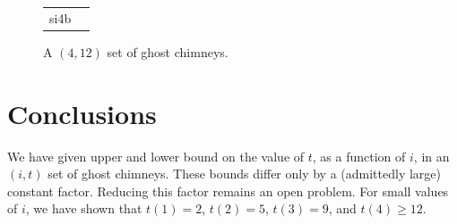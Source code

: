 \documentclass{cccg10}
\begin{document}
\begin{figure}
\begin{center}
\begin{tabular}{cc}
s{i4b}
    \end{tabular}
  \end{center}
  \caption{A $(4,12)$ set of ghost chimneys.}
\end{figure}


\section{Conclusions}

We have given upper and lower bound on the value of $t$, as a function of
$i$, in an $(i,t)$ set of ghost chimneys.  These bounds differ only by a
(admittedly large) constant factor.  Reducing this factor remains an open
problem.
For small values of $i$, we have shown that $t(1)=2$, $t(2)=5$,
$t(3)=9$, and $t(4)\ge 12$.




\end{document}

